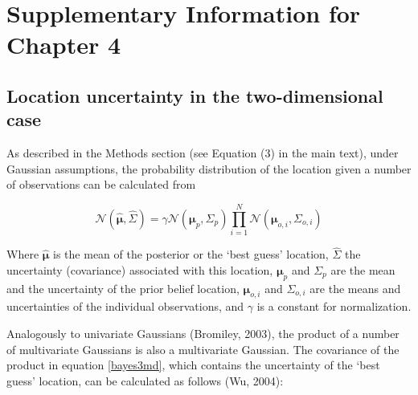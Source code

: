 %
%


\chapter{Supplementary Information for Chapter 4}
\label{apx:bayespc}

\section{Location uncertainty in the two-dimensional case}

As described in the Methods section (see Equation (3) in the main text), under Gaussian assumptions, the probability distribution of the location given a number of observations can be calculated from 

\begin{equation}\label{bayes3md}
\mathcal{N}( \hat{ \boldsymbol \mu }, \hat{ \Sigma } ) = \gamma \mathcal{N}( \boldsymbol \mu_p, \Sigma_p ) \prod_{i=1}^N { \mathcal{N}( \boldsymbol \mu_{o,i}, \Sigma_{o,i} ) }
\end{equation}

Where $ \hat{\boldsymbol \mu} $ is the mean of the posterior or the `best guess' location, $\hat{ \Sigma }$ the uncertainty (covariance) associated with this location, $\boldsymbol \mu_p$ and $\Sigma_p$ are the mean and the uncertainty of the prior belief location, $ \boldsymbol \mu_{o,i} $ and $ \Sigma_{o,i} $ are the means and uncertainties of the individual observations, and $ \gamma $ is a constant for normalization. 

Analogously to univariate Gaussians (Bromiley, 2003), the product of a number of multivariate Gaussians is also a multivariate Gaussian. The covariance of the product in equation \eqref{bayes3md}, which contains the uncertainty of the `best guess' location, can be calculated as follows (Wu, 2004):


